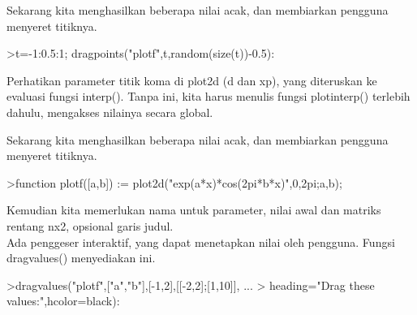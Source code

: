 \documentclass[a4paper,10pt]{article}
\begin{document}
\begin{eulernotebook}
\begin{eulercomment}
\begin{eulercomment}
\begin{eulercomment}
\begin{eulercomment}
\begin{eulercomment}
\begin{eulercomment}
\begin{eulercomment}
\begin{eulercomment}
\begin{eulercomment}
\begin{eulercomment}
\begin{eulercomment}
\begin{eulercomment}
\begin{eulercomment}
\begin{eulercomment}
\begin{eulercomment}
\begin{eulercomment}
\begin{eulercomment}
\begin{eulercomment}
\begin{eulercomment}
\begin{eulercomment}
\begin{eulercomment}
\begin{eulercomment}
\begin{eulercomment}
\begin{eulercomment}
\begin{eulercomment}
\begin{eulercomment}
\begin{eulercomment}
\begin{eulercomment}
\begin{eulercomment}
\begin{eulercomment}
\begin{eulercomment}
\begin{eulercomment}
\begin{eulercomment}
\begin{eulercomment}
\begin{eulercomment}
\begin{eulercomment}
\begin{eulercomment}
Sekarang kita menghasilkan beberapa nilai acak, dan membiarkan
pengguna menyeret titiknya.
\end{eulercomment}
\begin{eulerprompt}
>t=-1:0.5:1; dragpoints("plotf",t,random(size(t))-0.5):
\end{eulerprompt}
\begin{eulercomment}
Perhatikan parameter titik koma di plot2d (d dan xp), yang diteruskan
ke evaluasi fungsi interp(). Tanpa ini, kita harus menulis fungsi
plotinterp() terlebih dahulu, mengakses nilainya secara global.

Sekarang kita menghasilkan beberapa nilai acak, dan membiarkan
pengguna menyeret titiknya.
\end{eulercomment}
\begin{eulerprompt}
>function plotf([a,b]) := plot2d("exp(a*x)*cos(2pi*b*x)",0,2pi;a,b);
\end{eulerprompt}
\begin{eulercomment}
Kemudian kita memerlukan nama untuk parameter, nilai awal dan matriks
rentang nx2, opsional garis judul.\\
Ada penggeser interaktif, yang dapat menetapkan nilai oleh pengguna.
Fungsi dragvalues() menyediakan ini.
\end{eulercomment}
\begin{eulerprompt}
>dragvalues("plotf",["a","b"],[-1,2],[[-2,2];[1,10]], ...
>  heading="Drag these values:",hcolor=black):
\end{eulerprompt}
\begin{eulercomment}

\end{eulercomment}
\end{eulercomment}
\end{eulercomment}
\end{eulercomment}
\end{eulercomment}
\end{eulercomment}
\end{eulercomment}
\end{eulercomment}
\end{eulercomment}
\end{eulercomment}
\end{eulercomment}
\end{eulercomment}
\end{eulercomment}
\end{eulercomment}
\end{eulercomment}
\end{eulercomment}
\end{eulercomment}
\end{eulercomment}
\end{eulercomment}
\end{eulercomment}
\end{eulercomment}
\end{eulercomment}
\end{eulercomment}
\end{eulercomment}
\end{eulercomment}
\end{eulercomment}
\end{eulercomment}
\end{eulercomment}
\end{eulercomment}
\end{eulercomment}
\end{eulercomment}
\end{eulercomment}
\end{eulercomment}
\end{eulercomment}
\end{eulercomment}
\end{eulercomment}
\end{eulercomment}
\end{eulernotebook}
\end{document}

